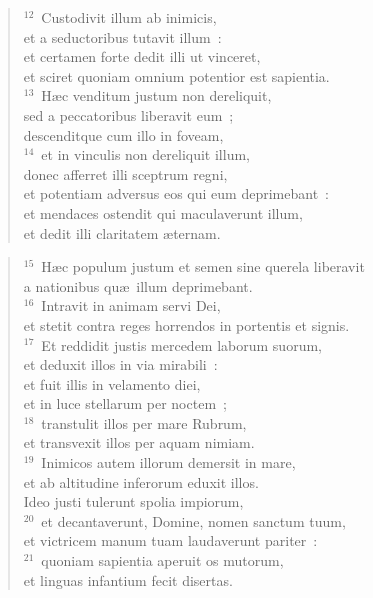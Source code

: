 \begin{verse}
${}^{12}$~Custodivit illum ab inimicis,\\ et a seductoribus tutavit illum~:\\ et certamen forte dedit illi ut vinceret,\\ et sciret quoniam omnium potentior est sapientia.\\
${}^{13}$~H\ae c venditum justum non dereliquit,\\ sed a peccatoribus liberavit eum~;\\ descenditque cum illo in foveam,\\
${}^{14}$~et in vinculis non dereliquit illum,\\ donec afferret illi sceptrum regni,\\ et potentiam adversus eos qui eum deprimebant~:\\ et mendaces ostendit qui maculaverunt illum,\\ et dedit illi claritatem \ae ternam.\end{verse}


\begin{verse}${}^{15}$~H\ae c populum justum et semen sine querela liberavit\\ a nationibus qu\ae\ illum deprimebant.\\
${}^{16}$~Intravit in animam servi Dei,\\ et stetit contra reges horrendos in portentis et signis.\\
${}^{17}$~Et reddidit justis mercedem laborum suorum,\\ et deduxit illos in via mirabili~:\\ et fuit illis in velamento diei,\\ et in luce stellarum per noctem~;\\
${}^{18}$~transtulit illos per mare Rubrum,\\ et transvexit illos per aquam nimiam.\\
${}^{19}$~Inimicos autem illorum demersit in mare,\\ et ab altitudine inferorum eduxit illos.\\ Ideo justi tulerunt spolia impiorum,\\
${}^{20}$~et decantaverunt, Domine, nomen sanctum tuum,\\ et victricem manum tuam laudaverunt pariter~:\\
${}^{21}$~quoniam sapientia aperuit os mutorum,\\ et linguas infantium fecit disertas.\end{verse}


